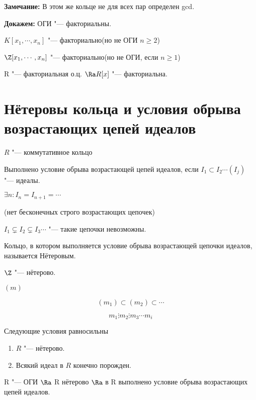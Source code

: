 \textbf{Замечание:} В этом же кольце не для всех пар определен gcd.

\textbf{Докажем:} ОГИ "--- факториальны.

$K[x_1, \cdots, x_n]$ "--- факториально(но не ОГИ $n \ge 2$)

$\Z[x_1, \cdots, x_n]$ "--- факториально(но не ОГИ, если $n \ge 1$)

R "--- факториальная о.ц. $\Ra R[x]$ "--- факториальна.


\section{Нётеровы кольца и условия обрыва возрастающих цепей идеалов}

$R$ "--- коммутативное кольцо

Выполнено условие обрыва возрастающей цепей идеалов, если $I_1 \subset I_2 \cdots (I_j)$ "--- идеалы.

$\exists n \colon I_n = I_{n + 1} = \cdots$

(нет бесконечных строго возрастающих цепочек)

$I_1 \subsetneq I_2 \subsetneq I_3 \cdots$ "--- такие цепочки невозможны. 

\begin{Def}
Кольцо, в котором выполняется условие обрыва возрастающей цепочки идеалов, называется Нётеровым.
\end{Def}

\begin{exmp}
$\Z$ "--- нётерово.

$(m)$

$$(m_1) \subset (m_2) \subset \cdots $$

$$m_1 \vdots m_2 \vdots m_3 \cdots m_i$$
\end{exmp}

\begin{theorem}{}
Следующие условия равносильны
\begin{enumerate}
\item $R$ "--- нётерово.
\item Всякий идеал в $R$ конечно порожден.
\end{enumerate}
\end{theorem}

\begin{conseq}
R "--- ОГИ $\Ra$ R нётерово $\Ra$ в R выполнено условие обрыва возрастающих цепей идеалов. 
\end{conseq}

